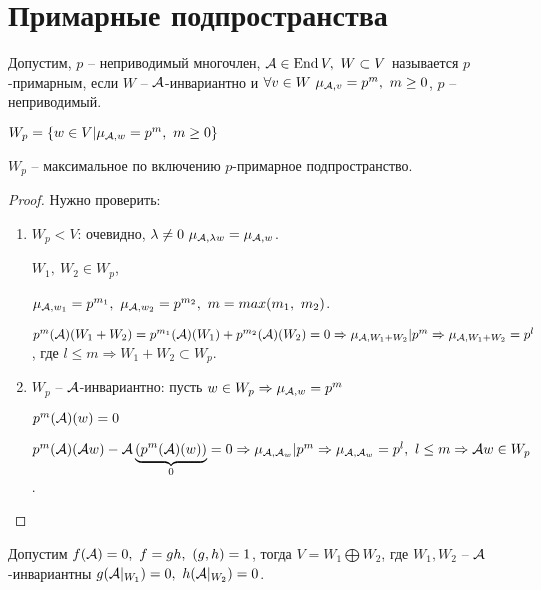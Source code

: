 \documentclass[main]{subfiles}
\begin{document}
\chapter{Примарные подпространства}

\begin{definition} 
    Допустим, $p$ -- неприводимый многочлен, $\mca \in \End V, \ W \subset V$ называется $p$-примарным, если $W$ -- $\mathcal{A}$-инвариантно
    и $\forall v \in W \ \mu_{\mathcal{A}, v} = p^m, \ m \geq 0$, $p$ -- неприводимый.

    $W_p = \{w \in V | \mu_{\mathcal{A}, w} = p^m, \ m \geq 0\}$
\end{definition}

\begin{proposition}
    $W_p$ -- максимальное по включению $p$-примарное подпространство.
\end{proposition}

\begin{proof}
    Нужно проверить:
    \begin{enumerate}
        \item $W_p < V$: очевидно, $\lambda \neq 0 \ \mu_{\mathcal{A}, \lambda w} = \mu_{\mathcal{A}, w}$.

              $W_1, \ W_2 \in W_p$,

              $\mu_{\mathcal{A}, w_1} = p^{m_1}, \ \mu_{\mathcal{A}, w_2} = p^{m_2}, \ m = max(m_1, \ m_2)$.

              $p^m(\mathcal{A})(W_1+W_2) = p^{m_1}(\mathcal{A})(W_1)+ p^{m_2}(\mathcal{A})(W_2) = 0 \Rightarrow
                  \mu_{\mathcal{A}, W_1 +W_2} | p^m \Rightarrow \mu_{\mathcal{A}, W_1 +W_2} = p^l$, где $l \leq m \Rightarrow W_1+W_2 \subset W_p$.
        \item $W_p$ -- $\mathcal{A}$-инвариантно: пусть $w \in W_p \Rightarrow \mu_{\mathcal{A}, w} = p^m$

              $p^m(\mathcal{A})(w) = 0$

              $p^m(\mathcal{A})(\mathcal{A} w) - \mathcal{A}\underbrace{(p^m(\mathcal{A})(w))}_{0} = 0 \Rightarrow \mu_{\mathcal{A}, \mathcal{A}_w} | p^m \Rightarrow \mu_{\mathcal{A}, \mathcal{A}_w} = p^l, \ l \leq m \Rightarrow \mathcal{A} w \in W_p$.
    \end{enumerate}
\end{proof}

\begin{proposition}
    Допустим $f(\mathcal{A}) = 0, \ f = gh, \ (g, h) = 1$, тогда $V = W_1 \bigoplus W_2$, где
    $W_1, W_2$ -- $\mathcal{A}$-инвариантны  $g(\mathcal{A}|_{W_1}) = 0, \  h(\mathcal{A} |_{W_2}) = 0$.
\end{proposition}
\end{document}
